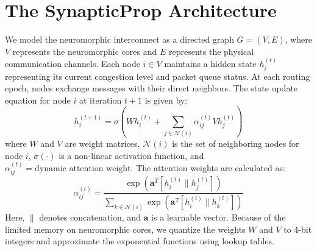 \section{The SynapticProp Architecture}
\label{sec:method}
We model the neuromorphic interconnect as a directed graph $G = (V, E)$, where $V$ represents the neuromorphic cores and $E$ represents the physical communication channels. Each node $i \in V$ maintains a hidden state $h_i^{(t)}$ representing its current congestion level and packet queue status. At each routing epoch, nodes exchange messages with their direct neighbors.
The state update equation for node $i$ at iteration $t+1$ is given by:
\begin{equation}
h_i^{(t+1)} = \sigma \left( W h_i^{(t)} + \sum_{j \in \mathcal{N}(i)} \alpha_{ij}^{(t)} V h_j^{(t)} \right)
\label{eq:state_update}
\end{equation}
where $W$ and $V$ are weight matrices, $\mathcal{N}(i)$ is the set of neighboring nodes for node $i$, $\sigma(\cdot)$ is a non-linear activation function, and $\alpha_{ij}^{(t)} = \text{dynamic attention weight}$. The attention weights are calculated as:
\begin{equation}
\alpha_{ij}^{(t)} = \frac{\exp\left( \mathbf{a}^T [h_i^{(t)} \parallel h_j^{(t)}] \right)}{\sum_{k \in \mathcal{N}(i)} \exp\left( \mathbf{a}^T [h_i^{(t)} \parallel h_k^{(t)}] \right)}
\label{eq:attention}
\end{equation}
Here, $\parallel$ denotes concatenation, and $\mathbf{a}$ is a learnable vector. Because of the limited memory on neuromorphic cores, we quantize the weights $W$ and $V$ to 4-bit integers and approximate the exponential functions using lookup tables.
